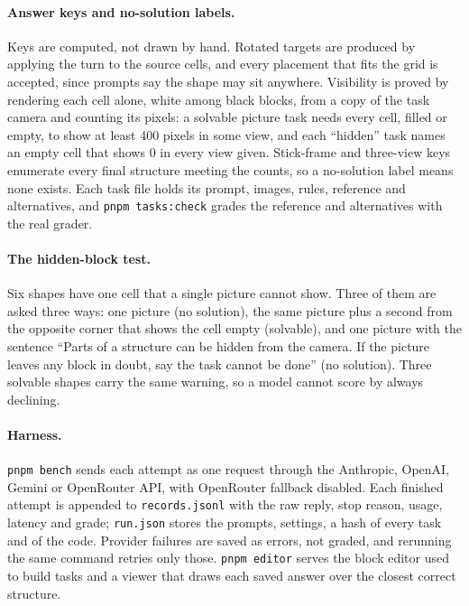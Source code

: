 \documentclass[10pt,twocolumn,letterpaper]{article}
\begin{document}
\paragraph{Answer keys and no-solution labels.} Keys are computed, not drawn by hand. Rotated targets are produced by applying the turn to the source cells, and every placement that fits the grid is accepted, since prompts say the shape may sit anywhere. Visibility is proved by rendering each cell alone, white among black blocks, from a copy of the task camera and counting its pixels: a solvable picture task needs every cell, filled or empty, to show at least 400 pixels in some view, and each ``hidden'' task names an empty cell that shows 0 in every view given. Stick-frame and three-view keys enumerate every final structure meeting the counts, so a no-solution label means none exists. Each task file holds its prompt, images, rules, reference and alternatives, and \texttt{pnpm tasks:check} grades the reference and alternatives with the real grader.

\paragraph{The hidden-block test.} Six shapes have one cell that a single picture cannot show. Three of them are asked three ways: one picture (no solution), the same picture plus a second from the opposite corner that shows the cell empty (solvable), and one picture with the sentence ``Parts of a structure can be hidden from the camera. If the picture leaves any block in doubt, say the task cannot be done'' (no solution). Three solvable shapes carry the same warning, so a model cannot score by always declining.

\paragraph{Harness.} \texttt{pnpm bench} sends each attempt as one request through the Anthropic, OpenAI, Gemini or OpenRouter API, with OpenRouter fallback disabled. Each finished attempt is appended to \texttt{records.jsonl} with the raw reply, stop reason, usage, latency and grade; \texttt{run.json} stores the prompts, settings, a hash of every task and of the code. Provider failures are saved as errors, not graded, and rerunning the same command retries only those. \texttt{pnpm editor} serves the block editor used to build tasks and a viewer that draws each saved answer over the closest correct structure.
\end{document}
